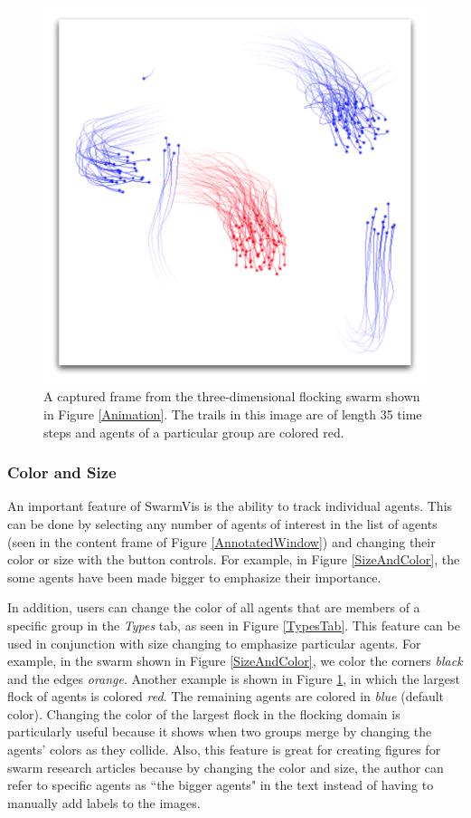 \documentclass[conference]{IEEEtran}
\begin{document}
\begin{figure}
\centering
\includegraphics[scale=.45]{images/flockcolor.pdf}
\caption{
A captured frame from the three-dimensional flocking swarm shown in Figure \ref{Animation}.
The trails in this image are of length 35 time steps and agents of a particular group are colored red.}
\label{FlockColor}
\end{figure}


\subsubsection{Color and Size}

An important feature of SwarmVis is the ability to track individual agents.
This can be done by selecting any number of agents of interest in the list of agents
(seen in the content frame of Figure \ref{AnnotatedWindow})
and changing their color or size with the button controls.
For example, in Figure \ref{SizeAndColor}, the some agents have been made bigger to emphasize their importance.

In addition, users can change the color of all agents that are members of a specific group in the \textit{Types} tab, as seen
in Figure \ref{TypesTab}.
This feature can be used in conjunction with size changing to emphasize particular agents.
For example, in the swarm shown in
Figure \ref{SizeAndColor}, we color the corners \textit{black} and the edges \textit{orange}. Another
example is shown in Figure \ref{FlockColor}, in which the largest flock of agents is colored \textit{red}. The remaining agents are colored in \textit{blue} (default color).
Changing the color of the largest flock in the flocking domain is
particularly useful because it shows when two groups merge by changing the agents' colors
as they collide.
Also, this feature is great for creating figures for swarm research articles because
by changing the color and size, the author can refer to specific agents as ``the bigger agents"
in the text instead of having to manually add labels to the images.
\end{document}
